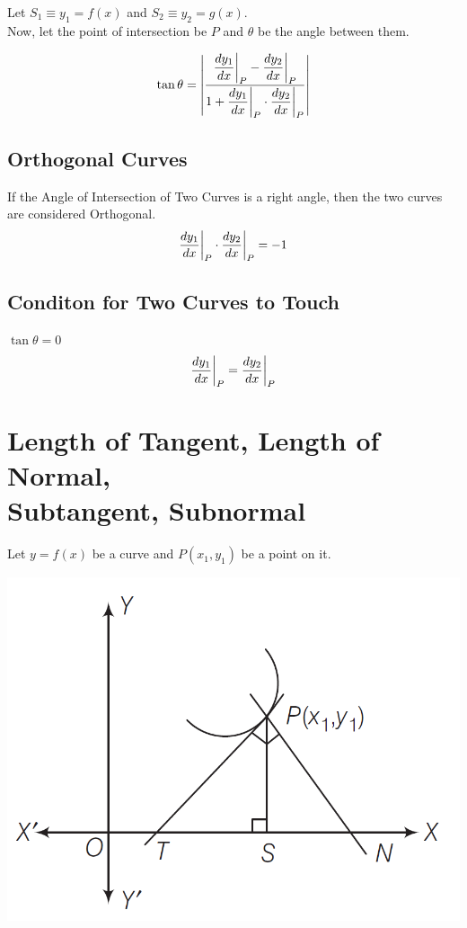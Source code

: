 \documentclass{article}
\begin{document}
Let $S_{1} \equiv y_{1}=f(x)$ and $S_{2} \equiv y_{2}=g(x)$. \\ Now, let the point of intersection be $P$ and $\theta$ be the angle between them.

$$\tan \theta = \abs{\dfrac{\displaystyle\dv{y_{1}}{x} \biggr\rvert_{P}-\displaystyle\dv{y_{2}}{x} \biggr\rvert_{P}}{1+\displaystyle\dv{y_{1}}{x} \biggr\rvert_{P} \cdot \displaystyle\dv{y_{2}}{x} \biggr\rvert_{P}}}$$

\subsection*{Orthogonal Curves}
If the Angle of Intersection of Two Curves is a right angle, then the two curves are considered Orthogonal.
$$\displaystyle\dv{y_{1}}{x} \biggr\rvert_{P} \cdot \displaystyle\dv{y_{2}}{x} \biggr\rvert_{P}=-1$$

\subsection*{Conditon for Two Curves to Touch}
$\tan \theta = 0$
$$\displaystyle\dv{y_{1}}{x} \biggr\rvert_{P}=\displaystyle\dv{y_{2}}{x} \biggr\rvert_{P}$$

\section{Length of Tangent, Length of Normal,\\ Subtangent, Subnormal}
Let $y=f(x)$ be a curve and $P\left(x_{1},y_{1}\right)$ be a point on it.

\graphicspath{{./images/}}
\includegraphics[scale=0.4]{image.png}
\end{document}
